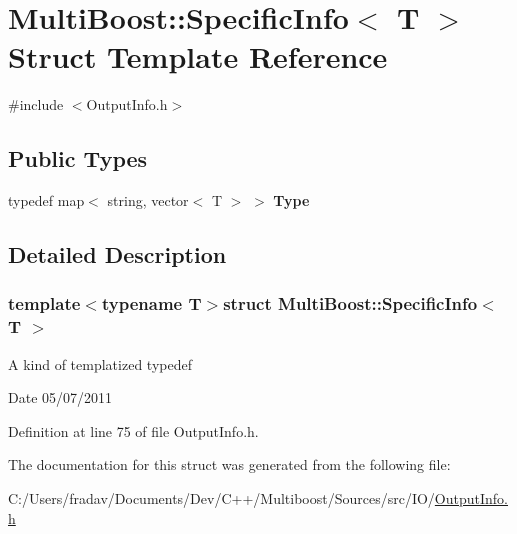 \hypertarget{structMultiBoost_1_1SpecificInfo}{\section{Multi\-Boost\-:\-:Specific\-Info$<$ T $>$ Struct Template Reference}
\label{structMultiBoost_1_1SpecificInfo}
}


{\ttfamily \#include $<$Output\-Info.\-h$>$}

\subsection*{Public Types}
\begin{DoxyCompactItemize}
\item 
\hypertarget{structMultiBoost_1_1SpecificInfo_a3d18e6fab9ae12d7ceecf268972110f8}{typedef map$<$ string, vector$<$ T $>$ $>$ {\bfseries Type}}\label{structMultiBoost_1_1SpecificInfo_a3d18e6fab9ae12d7ceecf268972110f8}

\end{DoxyCompactItemize}


\subsection{Detailed Description}
\subsubsection*{template$<$typename T$>$struct Multi\-Boost\-::\-Specific\-Info$<$ T $>$}

A kind of templatized typedef \begin{DoxyDate}{Date}
05/07/2011 
\end{DoxyDate}


Definition at line 75 of file Output\-Info.\-h.



The documentation for this struct was generated from the following file\-:\begin{DoxyCompactItemize}
\item 
C\-:/\-Users/fradav/\-Documents/\-Dev/\-C++/\-Multiboost/\-Sources/src/\-I\-O/\hyperlink{OutputInfo_8h}{Output\-Info.\-h}\end{DoxyCompactItemize}
